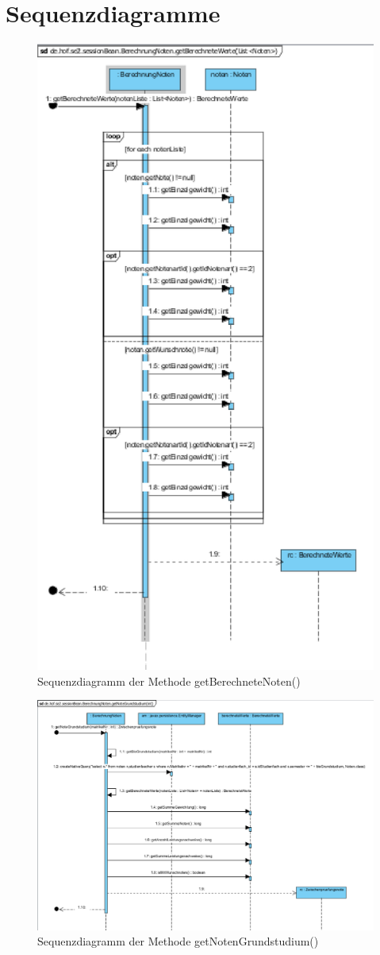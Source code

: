 \documentclass[12pt,a4paper,parskip]{scrreprt}
\begin{document}
\section{Sequenzdiagramme}
\begin{figure}
\centering
\includegraphics[width=0.7\linewidth]{../VP/getBerechneteNoten}
\caption[Sequenzdiagramm getBerechneteNoten()]{Sequenzdiagramm der Methode getBerechneteNoten()}
\label{fig:getBerechneteNoten}
\end{figure}

\begin{figure}
\centering
\includegraphics[width=0.7\linewidth]{../VP/getNotenGrundstudium}
\caption[Sequenzdiagramm getNotenGrundstudium()]{Sequenzdiagramm der Methode getNotenGrundstudium()}
\label{fig:getNotenGrundstudium}
\end{figure}
\end{document}
